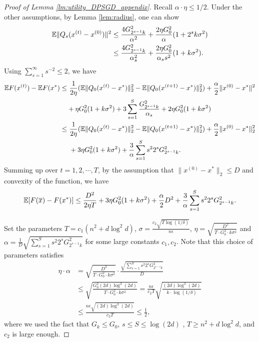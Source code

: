 \begin{proof}[Proof of Lemma \ref{lm:utility_DPSGD_appendix}]
Recall $\alpha\cdot\eta\leq 1/2$. Under the other assumptions, by Lemma \ref{lem:radius}, one can show
\begin{align*}
\mathbb{E}\|Q_{s}(x^{(t)}-x^{(0)})\|^{2} & \leq\frac{4 G_{2^{s-1}k}^{2}}{\alpha^{2}}+\frac{2\eta G_{0}^{2}}{\alpha}(1+2^{s}k\sigma^{2})\\
 & \leq\frac{4 G_{2^{s-1}k}^{2}}{\alpha_{s}^{2}}+\frac{2\eta G_{0}^{2}}{\alpha_{s} s^2}(1+k\sigma^2).
\end{align*}
Using $\sum_{s=1}^{\infty} s^{-2} \leq 2$, we have
\begin{align*}
\mathbb{E} F(x^{(t)})-\mathbb{E} F(x^{*}) \leq &~ \frac{1}{2\eta}(
    \mathbb{E}\|Q_{0}(x^{(t)}-x^{*})\|_2^{2} - 
    \mathbb{E}\|Q_{0}(x^{(t+1)}-x^{*})\|_2^{2}
) + \frac{\alpha}{2}\|x^{(0)}-x^{*}\|^{2}\\
&+ \eta G_0^2(1+k\sigma^2)+3\sum_{s=1}^S\frac{G_{2^{s-1}k}^2}{\alpha_s}+2 \eta G_0^2(1+k\sigma^2)\\
\leq  &~ \frac{1}{2\eta}(
    \mathbb{E}\|Q_{0}(x^{(t)}-x^{*})\|_2^{2} -
    \mathbb{E}\|Q_{0}(x^{(t+1)}-x^{*})\|_2^{2}
) + \frac{\alpha}{2}\|x^{(0)}-x^{*}\|_2^{2}\\
&~ +3\eta G_{0}^{2}(1+k\sigma^{2}) +\frac{3}{\alpha}\sum_{s=1}^S s^2 2^{s}G_{2^{s-1}k}^{2}.
\end{align*}
Summing up over $t=1,2,\cdots,T$, by the assumption that $\|x^{(0)}-x^*\|_2\leq D$ and convexity of the function, we have
\begin{align}
\label{eq:utility_eta_alpha}
\mathbb{E} [F(\overline{x})- F(x^{*})]\leq\frac{D^{2}}{2\eta T}+3\eta G_{0}^{2}(1+k\sigma^{2})+\frac{\alpha}{2}D^{2}+\frac{3}{\alpha}\sum_{s=1}^S s^2 2^{s}G_{2^{s-1}k}^{2}.    
\end{align}

Set the parameters $T=c_1 (n^2 + d \log^2 d)$, $\sigma=\frac{c_2\sqrt{T\log(1/\delta)}}{ n \epsilon}$,
$\eta=\sqrt{\frac{D^{2}}{T\cdot G_{0}^{2}\cdot k\sigma^{2}}}$
and $\alpha=\frac{1}{D}\sqrt{\sum_{s=1}^{S}s^2 2^{s}G_{2^{s-1}k}^{2}}$ for some large constants $c_1,c_2$. 
Note that this choice of parameters satisfies
\begin{align*}
\eta\cdot\alpha
& =
    \sqrt{\frac{D^{2}}{T\cdot G_{0}^{2}\cdot k\sigma^{2}}}\cdot\frac{\sqrt{\sum_{s=1}^{S}s^2 2^{s}G_{2^{s-1}k}^{2}}}{D}\\
 & \leq
    \sqrt{\frac{ G_{0}^{2} (2d) \log^3 (2d)}{T\cdot G_{0}^{2}\cdot k\sigma^{2}}}
    = 
        \frac{n\epsilon}{c_{2}T}\sqrt{\frac{ (2d) \log^3 (2d) }{k \cdot\log(1/\delta)}}\\
 & \leq\frac{n\epsilon\sqrt{ (2d) \log^3 (2d) }}{c_{2}T}\leq\frac{1}{2},
\end{align*}
where we used the fact that $G_k \leq G_0$, $s \le S \le \log (2d)$ , $T \geq n^2 + d \log^2 d$, and $c_2$ is large enough.


\end{proof}
